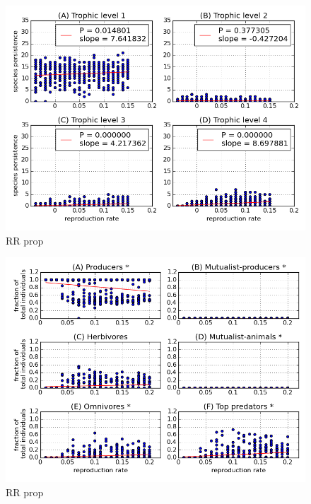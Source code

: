 \begin{figure}
	\centering
	\includegraphics[width=1.0\linewidth]{"figures/rr_species_richness_per_trophic_level_mai05"}
	\caption{RR prop}
	\label{fig:rr_species_per_trophic_level_mai05}
\end{figure}



\begin{figure}
	\centering
	\includegraphics[width=1.0\linewidth]{"figures/rr_proportion_per_functional_group_mai00"}
	\caption{RR prop}
	\label{fig:rr_prop_per_fg_mai0}
\end{figure}

